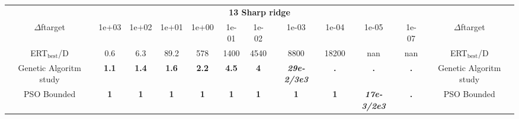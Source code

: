 \begin{tabular}{cccccccccccc}
 & \multicolumn{10}{c}{{\normalsize \textbf{13 Sharp ridge}}}\\
$\Delta$ftarget& 1e+03& 1e+02& 1e+01& 1e+00& 1e-01& 1e-02& 1e-03& 1e-04& 1e-05& 1e-07 & $\Delta$ftarget \\
ERT$_{\textrm{best}}$/D& 0.6& 6.3& 89.2& 578& 1400& 4540& 8800& 18200& nan& nan & ERT$_{\textrm{best}}$/D \\
\hline
Genetic Algoritm study & \textbf{1.1} & \textbf{1.4} & \textbf{1.6} & \textbf{2.2} & \textbf{4.5} & \textbf{4} & \textbf{\textit{29e-2}\textit{/3e3}} & \textbf{.} & \textbf{.} & \textbf{.} & Genetic Algoritm study \cite{add_an_entry_for_Genetic Algoritm study_in_bbob.bib}\\
PSO Bounded & \textbf{1} & \textbf{1} & \textbf{1} & \textbf{1} & \textbf{1} & \textbf{1} & \textbf{1} & \textbf{1} & \textbf{\textit{17e-3}\textit{/2e3}} & \textbf{.} & PSO Bounded \cite{add_an_entry_for_PSO Bounded_in_bbob.bib}
\end{tabular}
